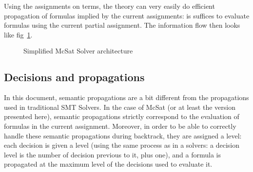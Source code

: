 \documentclass{article}
\begin{document}
Using the assignments on terms, the theory can very easily do efficient
propagation of formulas implied by the current assignments: is suffices to
evaluate formulas using the current partial assignment.
The information flow then looks like fig~\ref{fig:mcsat_flow}.

\begin{figure}
  \begin{center}
  \end{center}
  \caption{Simplified McSat Solver architecture}\label{fig:mcsat_flow}
\end{figure}

\subsection{Decisions and propagations}

In this document, semantic propagations are a bit different from the propagations
used in traditional SMT Solvers. In the case of McSat (or at least the version presented here),
semantic propagations strictly correspond to the evaluation of formulas in the
current assignment. Moreover, in order to be able to correctly handle these semantic
propagations during backtrack, they are assigned a level: each decision is given a level
(using the same process as in a \sat{} solvers: a decision level is the number of decision
previous to it, plus one), and a formula is propagated at the maximum level of the decisions
used to evaluate it.
\end{document}

